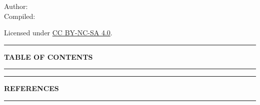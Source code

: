 \documentclass[12pt, a4paper, openright]{report}
\begin{document}
\vfill

\begin{center}
  {\small\color{white!50}Author: \textit{\NoteAuthor}}\\[0.3em]
  {\small\color{white!50}Compiled: \textit{\CompileDate}}

  {
    \vspace*{1em}
    \small \color{white!50}
    Licensed under \href{https://creativecommons.org/licenses/by-nc-sa/4.0/}{CC BY-NC-SA 4.0}.\\
    \vspace{0.5em}
  }
\end{center}

\clearpage
\pagestyle{fancy}

\begin{center}
  {\color{StarGold}\rule{0.4\textwidth}{0.5pt}}
\end{center}
\vspace{0.8cm}
{\centering\Large\bfseries\color{DeepSpace}TABLE OF CONTENTS\par}
\vspace{0.8cm}
\begin{center}
  {\color{StarGold}\rule{0.4\textwidth}{0.5pt}}
\end{center}
\vspace{1.2cm}
{%
  \hypersetup{linkcolor=DeepSpace}%
  \makeatletter{}\makeatother
}
\clearpage




\appendix


\clearpage

\begin{center}
  {\color{StarGold}\rule{0.4\textwidth}{0.5pt}}
\end{center}
\vspace{0.8cm}
{\centering\Large\bfseries\color{DeepSpace}REFERENCES\par}
\vspace{0.8cm}
\begin{center}
  {\color{StarGold}\rule{0.4\textwidth}{0.5pt}}
\end{center}
\vspace{1.2cm}

\nocite{*}
\label{bibliography}
\printbibliography[heading=none]

\end{document}
